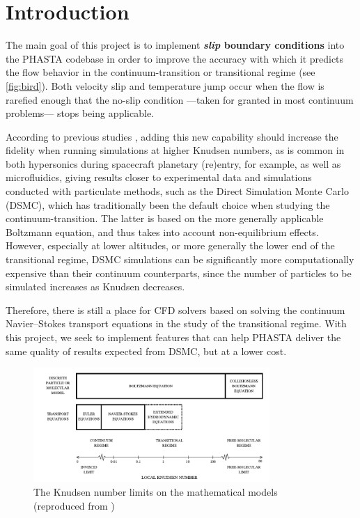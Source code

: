 \documentclass{ucb}
\begin{document}
\ucbcover

\section{Introduction}

The main goal of this project is to implement \textbf{\textit{slip} boundary conditions} into the PHASTA codebase in order to improve the accuracy with which it predicts the flow behavior in the continuum-transition or transitional regime (see \autoref{fig:bird}). Both velocity slip and temperature jump occur when the flow is rarefied enough that the no-slip condition ---taken for granted in most continuum problems--- stops being applicable.

According to previous studies \cite{boydSlip, evaluation}, adding this new capability should increase the fidelity when running simulations at higher Knudsen numbers, as is common in both hypersonics during spacecraft planetary (re)entry, for example, as well as microfluidics, giving results closer to experimental data and simulations conducted with particulate methods, such as the Direct Simulation Monte Carlo (DSMC), which has traditionally been the default choice when studying the continuum-transition. The latter is based on the more generally applicable Boltzmann equation, and thus takes into account non-equilibrium effects. However, especially at lower altitudes, or more generally the lower end of the transitional regime, DSMC simulations can be significantly more computationally expensive than their continuum counterparts, since the number of particles to be simulated increases as Knudsen decreases.

Therefore, there is still a place for CFD solvers based on solving the continuum Navier--Stokes transport equations in the study of the transitional regime. With this project, we seek to implement features that can help PHASTA deliver the same quality of results expected from DSMC, but at a lower cost.

\begin{figure}[H]
    \centering
    \includegraphics[width = 0.8\textwidth]{img/continuum_transition.pdf}
    \caption{The Knudsen number limits on the mathematical models (reproduced from \cite{bird})}
    \label{fig:bird}
\end{figure}
\end{document}
